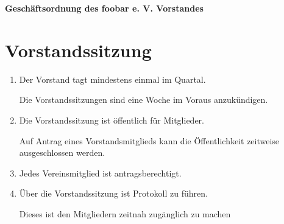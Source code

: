 \documentclass[10pt,a4paper]{scrartcl}
\begin{document}
\noindent
{\LARGE\bfseries Geschäftsordnung des foobar e. V. Vorstandes}


\section{Vorstandssitzung}

\begin{enumerate}[label=\bfseries (\arabic*),itemsep=6pt] 
\item
  Der Vorstand tagt mindestens einmal im Quartal.

  Die Vorstandssitzungen sind eine Woche im Voraus anzukündigen.

\item
  Die Vorstandssitzung ist öffentlich für Mitglieder.

  Auf Antrag eines Vorstandsmitglieds kann die Öffentlichkeit zeitweise ausgeschlossen
  werden.

\item
  Jedes Vereinsmitglied ist antragsberechtigt.

\item
  Über die Vorstandssitzung ist Protokoll zu führen.

  Dieses ist den Mitgliedern zeitnah zugänglich zu machen
\end{enumerate}
\end{document}
